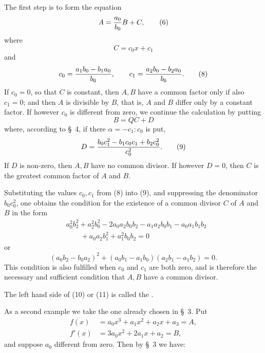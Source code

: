 
The first step is to form the equation
\begin{equation}
 A={a_0\over b_0}B+C,
\tag{6}
\end{equation}
where
\begin{equation}
 C=c_0x+c_1
\tag{7}
\end{equation}
and
\begin{equation}
 c_0={a_1b_0-b_1a_0\over b_0},
 \qquad
 c_1={a_2b_0-b_2a_0\over b_0}.
\tag{8}
\end{equation}
If $c_0=0$, so that $C$ is constant, then $A,B$ have a common factor only if also $c_1=0$; and then $A$ is divisible by $B$, that is, $A$ and $B$ differ only by a constant factor. If however $c_0$ is different from zero, we continue the calculation by putting
\[
 B=QC+D
\]
where, according to \S~4, if there $\alpha=-c_1:c_0$ is put,
\begin{equation}
 D={b_0c_1^2-b_1c_0c_1+b_2c_0^2\over c_0^2}.
\tag{9}
\end{equation}
If $D$ is non-zero, then $A,B$ have no common divisor. If however $D=0$, then $C$ is the greatest common factor of $A$ and $B$.

Substituting the values $c_0,c_1$ from (8) into (9), and suppressing the denominator $b_0c_0^2$, one obtains the condition for the existence of a common divisor $C$ of $A$ and $B$ in the form
\begin{equation}
\begin{aligned}
&a_0^2b_2^2+a_2^2b_0^2-2a_0a_2b_0b_2-a_1a_2b_0b_1-a_0a_1b_1b_2\\
&\qquad{}+a_0a_2b_1^2+a_1^2b_0b_2=0
\end{aligned}
\tag{10}
\end{equation}
or
\begin{equation}
 (a_0b_2-b_0a_2)^2+(a_0b_1-a_1b_0)(a_2b_1-a_1b_2)=0.
\tag{11}
\end{equation}
This condition is also fulfilled when $c_0$ and $c_1$ are both zero, and is therefore the necessary and sufficient condition that $A,B$ have a common divisor.

The left hand side of (10) or (11) is called the .

As a second example we take the one already chosen in \S~3. Put
\begin{equation}
\begin{aligned}
 f(x)&=a_0x^3+a_1x^2+a_2x+a_3=A,\\
 f'(x)&=3a_0x^2+2a_1x+a_2=B,
\end{aligned}
\tag{12}
\end{equation}
and suppose $a_0$ different from zero. Then by \S~3 we have:
